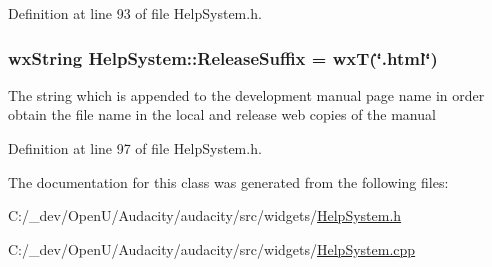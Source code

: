 Definition at line 93 of file Help\+System.\+h.

\subsubsection[{\texorpdfstring{Release\+Suffix}{ReleaseSuffix}}]{ wx\+String Help\+System\+::\+Release\+Suffix = wxT(\char`\"{}.html\char`\"{})\hspace{0.3cm}{\ttfamily [static]}}\hypertarget{class_help_system_a853fee51c51bab195800baeb3f7d406e}{}\label{class_help_system_a853fee51c51bab195800baeb3f7d406e}
The string which is appended to the development manual page name in order obtain the file name in the local and release web copies of the manual 

Definition at line 97 of file Help\+System.\+h.



The documentation for this class was generated from the following files\+:\begin{DoxyCompactItemize}
\item 
C\+:/\+\_\+dev/\+Open\+U/\+Audacity/audacity/src/widgets/\hyperlink{_help_system_8h}{Help\+System.\+h}\item 
C\+:/\+\_\+dev/\+Open\+U/\+Audacity/audacity/src/widgets/\hyperlink{_help_system_8cpp}{Help\+System.\+cpp}\end{DoxyCompactItemize}
